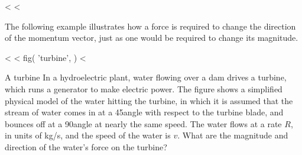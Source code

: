 <%
<%

The following example illustrates how a force is required to
change the direction of the momentum vector, just as one
would be required to change its magnitude.

<%
<%
  fig(
    'turbine',
  )
<%
\begin{eg}{A turbine}\label{eg:turbine}
\egquestion In a hydroelectric plant, water flowing over a dam
drives a turbine, which runs a generator to make electric
power. The figure shows a simplified physical model of the
water hitting the turbine, in which it is assumed that the
stream of water comes in at a 45\degunit angle with respect to
the turbine blade, and bounces off at a 90\degunit angle at
nearly the same speed. The water flows at a rate $R$, in
units of kg/s, and the speed of the water is $v$. What are
the magnitude and direction of the water's force on the turbine?


\end{eg}
